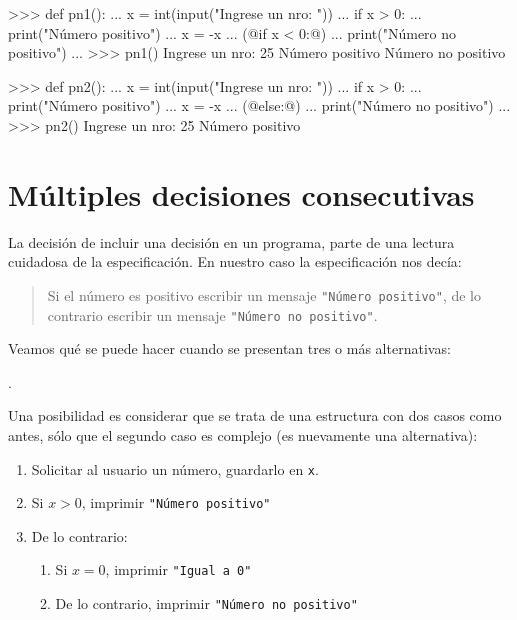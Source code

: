\noindent
\begin{minipage}[t]{80mm}
\begin{codigo-python-sn-small}
>>> def pn1():
...   x = int(input("Ingrese un nro: "))
...   if x > 0:
...      print("Número positivo")
...      x = -x
...   (@if x < 0:@)
...      print("Número no positivo")
...
>>> pn1()
Ingrese un nro: 25
Número positivo
Número no positivo
\end{codigo-python-sn-small}
\end{minipage}
\begin{minipage}[t]{80mm}
\begin{codigo-python-sn-small}
>>> def pn2():
...   x = int(input("Ingrese un nro: "))
...   if x > 0:
...      print("Número positivo")
...      x = -x
...   (@else:@)
...      print("Número no positivo")
...
>>> pn2()
Ingrese un nro: 25
Número positivo
\end{codigo-python-sn-small}
\end{minipage}
\normalsize

\section{Múltiples decisiones consecutivas}

La decisión de incluir una decisión en un programa, parte de una
lectura cuidadosa de la especificación. En nuestro caso la especificación
nos decía:

\begin{quote}
Si el número es positivo escribir un mensaje
\lstinline!"Número positivo"!, de lo contrario escribir un mensaje
\lstinline!"Número no positivo"!.
\end{quote}

Veamos qué se puede hacer cuando se presentan tres o más alternativas:

.

Una posibilidad es considerar que se trata de una estructura con dos
casos como antes, sólo que el segundo caso es complejo (es nuevamente una alternativa):

\begin{enumerate}
\item Solicitar al usuario un número, guardarlo en \lstinline!x!.
\item Si $x > 0$, imprimir \lstinline!"Número positivo"!
\item De lo contrario:
\begin{enumerate}
\item Si $x = 0$, imprimir \lstinline!"Igual a 0"!
\item De lo contrario, imprimir \lstinline!"Número no positivo"!
\end{enumerate}
\end{enumerate}

